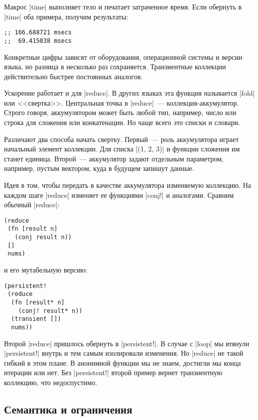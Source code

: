 Макрос \spverb|time| выполняет тело и печатает затраченное время. Если обернуть
в \spverb|time| оба примера, получим результаты:

\begin{verbatim}
;; 166.688721 msecs
;;  69.415038 msecs
\end{verbatim}

Конкретные цифры зависят от оборудования, операционной системы и версии языка,
но разница в несколько раз сохраняется. Транзиентные коллекции действительно
быстрее постоянных аналогов.

Ускорение работает и для \spverb|reduce|. В других языках эта функция называется
\spverb|fold| или <<свертка>>. Центральная точка в \spverb|reduce|~---
коллекция-аккумулятор. Строго говоря, аккумулятором может быть любой тип,
например, число или строка для сложения или конкатенации. Но чаще всего это
списки и словари.

Различают два способа начать свертку. Первый~--- роль аккумулятора играет
начальный элемент коллекции. Для списка \spverb|(1, 2, 3)| и функции сложения им
станет единица. Второй~--- аккумулятор задают отдельным параметром, например,
пустым вектором, куда в будущем запишут данные.

Идея в том, чтобы передать в качестве аккумулятора изменяемую коллекцию. На
каждом шаге \spverb|reduce| изменяет ее функциями \spverb|conj!| и
аналогами. Сравним обычный \spverb|reduce|:

\begin{verbatim}
(reduce
 (fn [result n]
   (conj result n))
 []
 nums)
\end{verbatim}

\noindent
и его мутабельную версию:

\begin{verbatim}
(persistent!
 (reduce
  (fn [result* n]
    (conj! result* n))
  (transient [])
  nums))
\end{verbatim}

Второй \spverb|reduce| пришлось обернуть в \spverb|persistent!|. В случае с
\spverb|loop| мы втянули \spverb|persistent!| внутрь и тем самым изолировали
изменения. Но \spverb|reduce| не такой гибкий в этом плане. В анонимной функции
мы не знаем, достигли мы конца итерации или нет. Без \spverb|persistent!| второй
пример вернет транзиентную коллекцию, что недоспустимо.

\subsection{Семантика и ограничения}


